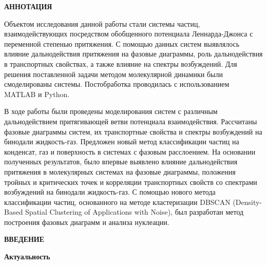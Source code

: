 \newpage
\begin{center}
  \textbf{\large АННОТАЦИЯ}
\end{center}


Объектом исследования данной работы стали системы частиц, взаимодействующих посредством обобщенного потенциала Леннарда-Джонса с переменной степенью притяжения.
С помощью данных систем выявлялось влияние дальнодействия притяжения на фазовые диаграммы, роль дальнодействия в транспортных свойствах, а также влияние на спектры возбуждений.
Для решения поставленной задачи методом молекулярной динамики были смоделированы системы.
Постобработка проводилась с использованием MATLAB и Python.

В ходе работы были проведены моделирования систем с различным дальнодействием притягивающей ветви потенциала взаимодействия.
Рассчитаны фазовые диаграммы систем, их транспортные свойства и спектры возбуждений на бинодали жидкость-газ.
Предложен новый метод классификации частиц на конденсат, газ и поверхность в системах с фазовым расслоением.
На основании полученных результатов, было впервые выявлено влияние дальнодействия притяжения в молекулярных системах на фазовые диаграммы, положения тройных и критических точек и корреляции транспортных свойств со спектрами возбуждений на бинодали жидкость-газ.
С помощью нового метода классификации частиц, основанного на методе кластеризации DBSCAN (Density-Based Spatial Clustering of Applications with Noise), был разработан метод построения фазовых диаграмм и анализа нуклеации.

\onehalfspacing
\setcounter{page}{2}

\newpage
\renewcommand{\contentsname}{\centerline{\large СОДЕРЖАНИЕ}}
\tableofcontents

\newpage
\begin{center}
  \textbf{\large ВВЕДЕНИЕ}
\end{center}


\textbf{Актуальность}

